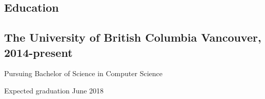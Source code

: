 \documentclass[letterpaper]{article}
\newcommand{\subtitle}{\normalfont\sffamily\color{black}\large}
\begin{document}
\begin{multicols}{2}
\section*{Education}

\subsection*{The University of British Columbia \subtitle Vancouver,
  2014-present}

Pursuing Bachelor of Science in Computer Science

Expected graduation June 2018
\end{multicols}
\end{document}

